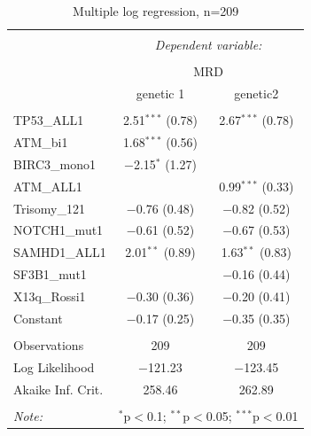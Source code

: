 \documentclass[a4paper,11pt]{article}
\begin{document}
\begin{table}[!htbp] \centering 
  \caption{Multiple log regression, n=209} 
  \label{} 
\tiny 
\begin{tabular}{@{\extracolsep{5pt}}lcc} 
\\[-1.8ex]\hline 
\hline \\[-1.8ex] 
 & \multicolumn{2}{c}{\textit{Dependent variable:}} \\ 
\cline{2-3} 
\\[-1.8ex] & \multicolumn{2}{c}{MRD} \\ 
 & genetic 1 & genetic2 \\ 
\hline \\[-1.8ex] 
 TP53\_ALL1 & 2.51$^{***}$ (0.78) & 2.67$^{***}$ (0.78) \\ 
  ATM\_bi1 & 1.68$^{***}$ (0.56) &  \\ 
  BIRC3\_mono1 & $-$2.15$^{*}$ (1.27) &  \\ 
  ATM\_ALL1 &  & 0.99$^{***}$ (0.33) \\ 
  Trisomy\_121 & $-$0.76 (0.48) & $-$0.82 (0.52) \\ 
  NOTCH1\_mut1 & $-$0.61 (0.52) & $-$0.67 (0.53) \\ 
  SAMHD1\_ALL1 & 2.01$^{**}$ (0.89) & 1.63$^{**}$ (0.83) \\ 
  SF3B1\_mut1 &  & $-$0.16 (0.44) \\ 
  X13q\_Rossi1 & $-$0.30 (0.36) & $-$0.20 (0.41) \\ 
  Constant & $-$0.17 (0.25) & $-$0.35 (0.35) \\ 
 \hline \\[-1.8ex] 
Observations & 209 & 209 \\ 
Log Likelihood & $-$121.23 & $-$123.45 \\ 
Akaike Inf. Crit. & 258.46 & 262.89 \\ 
\hline 
\hline \\[-1.8ex] 
\textit{Note:}  & \multicolumn{2}{l}{$^{*}$p$<$0.1; $^{**}$p$<$0.05; $^{***}$p$<$0.01} \\ 
\end{tabular} 
\end{table} %
\end{document}

